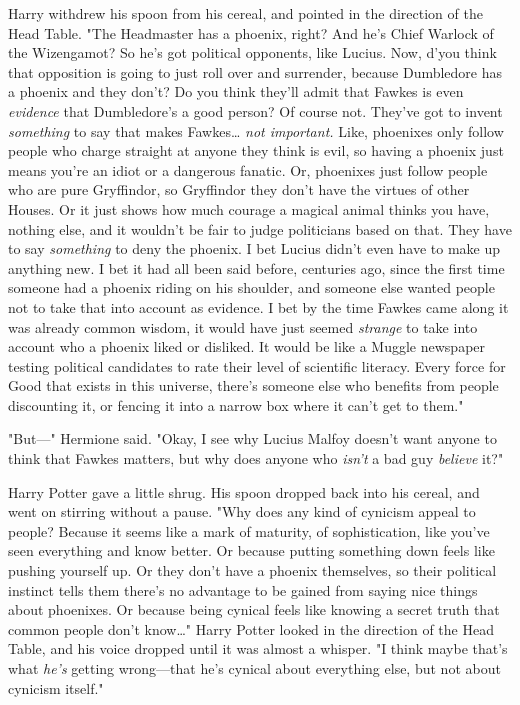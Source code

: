 Harry withdrew his spoon from his cereal, and pointed in the direction of the
Head Table. "The Headmaster has a phoenix, right? And he's Chief Warlock of the
Wizengamot? So he's got political opponents, like Lucius. Now, d'you think that
opposition is going to just roll over and surrender, because Dumbledore has a
phoenix and they don't? Do you think they'll admit that Fawkes is even
\emph{evidence} that Dumbledore's a good person? Of course not. They've got to
invent \emph{something} to say that makes Fawkes{\ldots} \emph{not important.}
Like, phoenixes only follow people who charge straight at anyone they think is
evil, so having a phoenix just means you're an idiot or a dangerous fanatic.
Or, phoenixes just follow people who are pure Gryffindor, so Gryffindor they
don't have the virtues of other Houses. Or it just shows how much courage a
magical animal thinks you have, nothing else, and it wouldn't be fair to judge
politicians based on that. They have to say \emph{something} to deny the
phoenix. I bet Lucius didn't even have to make up anything new. I bet it had
all been said before, centuries ago, since the first time someone had a phoenix
riding on his shoulder, and someone else wanted people not to take that into
account as evidence. I bet by the time Fawkes came along it was already common
wisdom, it would have just seemed \emph{strange} to take into account who a
phoenix liked or disliked. It would be like a Muggle newspaper testing
political candidates to rate their level of scientific literacy. Every force
for Good that exists in this universe, there's someone else who benefits from
people discounting it, or fencing it into a narrow box where it can't get to
them."

"But---" Hermione said. "Okay, I see why Lucius Malfoy doesn't want anyone to
think that Fawkes matters, but why does anyone who \emph{isn't} a bad guy
\emph{believe} it?"

Harry Potter gave a little shrug. His spoon dropped back into his cereal, and
went on stirring without a pause. "Why does any kind of cynicism appeal to
people? Because it seems like a mark of maturity, of sophistication, like
you've seen everything and know better. Or because putting something down feels
like pushing yourself up. Or they don't have a phoenix themselves, so their
political instinct tells them there's no advantage to be gained from saying
nice things about phoenixes. Or because being cynical feels like knowing a
secret truth that common people don't know{\ldots}" Harry Potter looked in the
direction of the Head Table, and his voice dropped until it was almost a
whisper. "I think maybe that's what \emph{he's} getting wrong---that he's
cynical about everything else, but not about cynicism itself."

